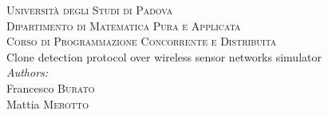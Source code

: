\documentclass[10pt,a4paper]{article}
\begin{document}
\begin{center}
  \thispagestyle{empty}
  \textsc{\Large Università degli Studi di Padova}\\[0.5cm]
  \textsc{\Large Dipartimento di Matematica Pura e Applicata}\\[0.5cm] 
  \textsc{\Large Corso di Programmazione Concorrente e Distribuita}\\[0.5cm]
  \vspace{5cm}
  {\Huge Clone detection protocol over wireless sensor networks simulator}\\[2cm]
  \emph{Authors:}\\
  Francesco \textsc{Burato}\\
  Mattia \textsc{Merotto}\\
\end{center}
\newpage
\setcounter{page}{1}




\end{document}
